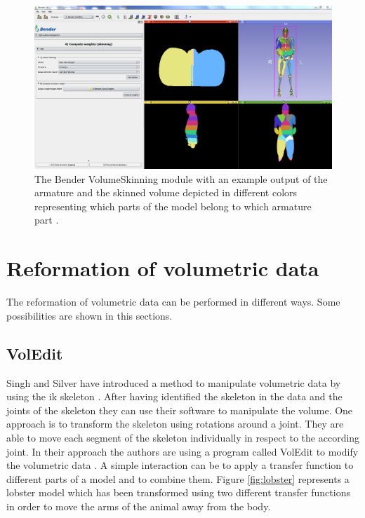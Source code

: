\begin{figure} [htb!]
    \centering
	\includegraphics[width=13cm]{content/images/BenderVolumeSkinning}
	\caption{The Bender VolumeSkinning module with an example output of the armature and the skinned volume depicted in different colors representing which parts of the model belong to which armature part \cite{Andruejol2014BenderModules}.} 
	\label{fig:BenderVolumeSkinning}
\end{figure}

\section{Reformation of volumetric data}

The reformation of volumetric data can be performed in different ways. Some possibilities are shown in this sections.

\subsection{VolEdit}

Singh and Silver have introduced a method to manipulate volumetric data by using the \gls{ik} skeleton \cite{Singh2004}. After having identified the skeleton in the data and the joints of the skeleton they can use their software to manipulate the volume. One approach is to transform the skeleton using rotations around a joint. They are able to move each segment of the skeleton individually in respect to the according joint. In their approach the authors are using a program called VolEdit to modify the volumetric data \cite{Singh2004}. A simple interaction can be to apply a  transfer function to different parts of a model and to combine them. Figure \ref{fig:lobster} represents a lobster model which has been transformed using two different transfer functions in order to move the arms of the animal away from the body.

